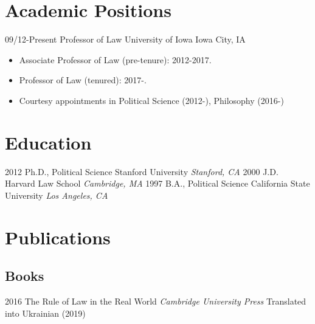 \documentclass[letterpaper]{moderncv}
\begin{document}
\makecvtitle

\lfoot{\thepage}

%
%
\section{Academic Positions}
\cventry
{09/12-Present}
{Professor of Law}
{University of Iowa}
{Iowa City, IA}
{}
{\begin{itemize}%
	\item Associate Professor of Law (pre-tenure): 2012-2017.
	\item Professor of Law (tenured): 2017-.
	\item Courtesy appointments in Political Science (2012-), Philosophy (2016-)
	\end{itemize}}
%
%
\section{Education}
\cventry
{2012}
{Ph.D., Political Science}
{Stanford University}
{}
{\textit{Stanford, CA}}
{}
\cventry
{2000}
{J.D.}
{Harvard Law School}
{}
{\textit{Cambridge, MA}}
{}
\cventry
{1997}
{B.A., Political Science}
{California State University}
{}
{\textit{Los Angeles, CA}}
{}
%
%
\section{Publications}
\subsection{Books}
\cventry
{2016}
{The Rule of Law in the Real World}
{}
{\textit{Cambridge University Press}}
{}
{Translated into Ukrainian (2019)}
\vspace{1mm}
\vspace{1mm}
\end{document}

